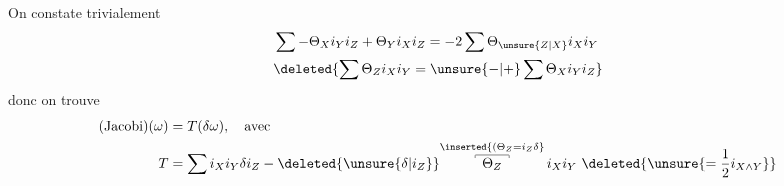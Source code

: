 On constate trivialement
\[
\begin{aligned}
&\sum-\Theta_X i_Y i_Z+\Theta_Y i_X i_Z=-2\sum\Theta_{\unsure{Z|X}}i_X i_Y\\
&\deleted{\sum\Theta_Z i_X i_Y=\unsure{-|+}\sum\Theta_X i_Y i_Z}
\end{aligned}
\]
donc on trouve
\[
\begin{aligned}
(\text{Jacobi})(\omega)&=T(\delta\omega),\quad\text{avec}\\
T&=\sum i_X i_Y\delta i_Z-\deleted{\unsure{\delta|i_Z}}\overset{\inserted{(\Theta_Z=i_Z\delta}}{\overset{\smash{\rule[-2pt]{.35pt}{2pt}\rule{2.4em}{.35pt}\rule[-2pt]{.35pt}{2pt}}}{\Theta_Z}}\,i_X i_Y\ \deleted{\unsure{=\frac{1}{2}i_{X\wedge Y}}}
\end{aligned}
\]
